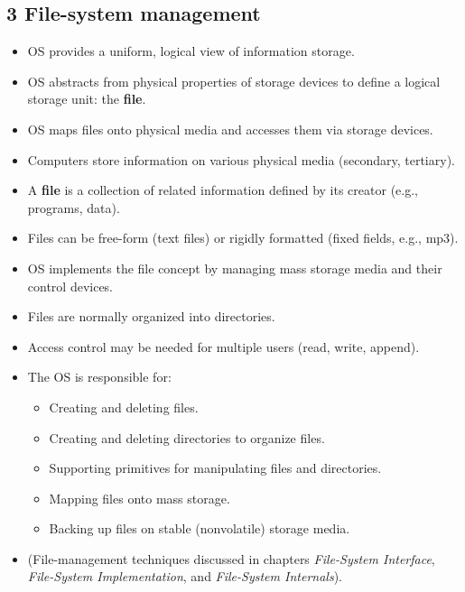 \documentclass{article}
\begin{document}
\subsection*{3 File-system management}
\begin{itemize}
    \item OS provides a uniform, logical view of information storage.
    \item OS abstracts from physical properties of storage devices to define a logical storage unit: the \textbf{file}.
    \item OS maps files onto physical media and accesses them via storage devices.
    \item Computers store information on various physical media (secondary, tertiary).
    \item A \textbf{file} is a collection of related information defined by its creator (e.g., programs, data).
    \item Files can be free-form (text files) or rigidly formatted (fixed fields, e.g., mp3).
    \item OS implements the file concept by managing mass storage media and their control devices.
    \item Files are normally organized into directories.
    \item Access control may be needed for multiple users (read, write, append).
    \item The OS is responsible for:
    \begin{itemize}
        \item Creating and deleting files.
        \item Creating and deleting directories to organize files.
        \item Supporting primitives for manipulating files and directories.
        \item Mapping files onto mass storage.
        \item Backing up files on stable (nonvolatile) storage media.
    \end{itemize}
    \item (File-management techniques discussed in chapters \textit{File-System Interface}, \textit{File-System Implementation}, and \textit{File-System Internals}).
\end{itemize}
\end{document}
